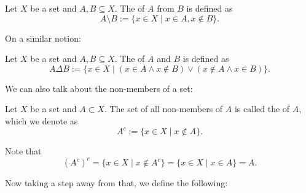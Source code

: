 \documentclass[notoc,notitlepage]{tufte-book}
\begin{document}
\begin{defn}
\label{defn:set_difference}
  Let $X$ be a set and $A, B \subseteq X$. The  of $A$ from $B$ is defined as
  \begin{equation*}
    A \setminus B := \{ x \in X \mid x \in A, x \notin B \}.
  \end{equation*}
\end{defn}

On a similar notion:

\begin{defn}
\label{defn:symmetric_difference}
Let $X$ be a set and $A, B \subseteq X$. The  of $A$ and $B$ is defined as
  \begin{equation*}
    A \Delta B := \{ x \in X \mid ( x \in A \land x \notin B ) \lor ( x \notin A \land x \in B ) \}.
  \end{equation*}
\end{defn}

We can also talk about the non-members of a set:

\begin{defn}
\label{defn:set_complement}
  Let $X$ be a set and $A \subset X$. The set of all non-members of $A$ is called the  of $A$, which we denote as
  \begin{equation*}
    A^c := \{ x \in X \mid x \notin A \}.
  \end{equation*}
\end{defn}

\begin{note}
  Note that
  \begin{equation*}
    \left( A^c \right)^c = \{ x \in X \mid x \notin A^c \} = \{ x \in X \mid x \in A \} = A.
  \end{equation*}
\end{note}

Now taking a step away from that, we define the following:
\end{document}
